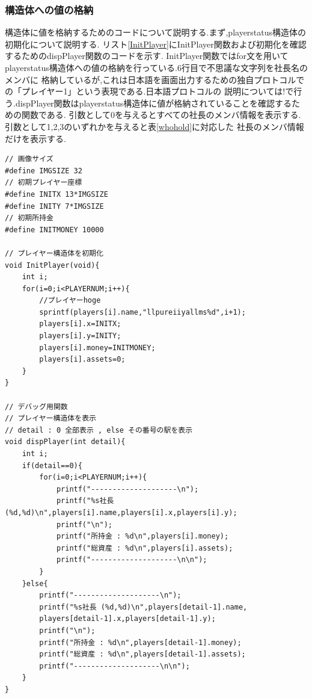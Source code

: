 \documentclass[a4j]{jarticle}
\begin{document}
    \subsubsection{構造体への値の格納}
    構造体に値を格納するためのコードについて説明する.まず,playerstatus構造体の初期化について説明する.
    リスト\ref{InitPlayer}にInitPlayer関数および初期化を確認するためのdispPlayer関数のコードを示す.
    InitPlayer関数ではfor文を用いてplayerstatus構造体への値の格納を行っている.6行目で不思議な文字列を社長名のメンバに
    格納しているが,これは日本語を画面出力するための独自プロトコルでの「プレイヤー1」という表現である.日本語プロトコルの
    説明については!で行う.dispPlayer関数はplayerstatus構造体に値が格納されていることを確認するための関数である.
    引数として0を与えるとすべての社長のメンバ情報を表示する.引数として1,2,3のいずれかを与えると表\ref{whohold}に対応した
    社長のメンバ情報だけを表示する.
    \begin{lstlisting}[basicstyle=\ttfamily\footnotesize, frame=single,label=InitPlayer,caption=playerstatus構造体への値の格納]
// 画像サイズ
#define IMGSIZE 32
// 初期プレイヤー座標
#define INITX 13*IMGSIZE
#define INITY 7*IMGSIZE
// 初期所持金
#define INITMONEY 10000

// プレイヤー構造体を初期化
void InitPlayer(void){
    int i;
    for(i=0;i<PLAYERNUM;i++){
        //プレイヤーhoge
        sprintf(players[i].name,"llpureiiyallms%d",i+1);
        players[i].x=INITX;
        players[i].y=INITY;
        players[i].money=INITMONEY;
        players[i].assets=0;
    }
}

// デバッグ用関数 	
// プレイヤー構造体を表示	
// detail : 0 全部表示 , else その番号の駅を表示	
void dispPlayer(int detail){	
    int i;	
    if(detail==0){	
        for(i=0;i<PLAYERNUM;i++){	
            printf("--------------------\n");	
            printf("%s社長 (%d,%d)\n",players[i].name,players[i].x,players[i].y);	
            printf("\n");	
            printf("所持金 : %d\n",players[i].money);	
            printf("総資産 : %d\n",players[i].assets);	
            printf("--------------------\n\n");	
        }	
    }else{	
        printf("--------------------\n");	
        printf("%s社長 (%d,%d)\n",players[detail-1].name,
        players[detail-1].x,players[detail-1].y);	
        printf("\n");	
        printf("所持金 : %d\n",players[detail-1].money);	
        printf("総資産 : %d\n",players[detail-1].assets);	
        printf("--------------------\n\n");   	
    }	
}
          \end{lstlisting}        
\end{document}
